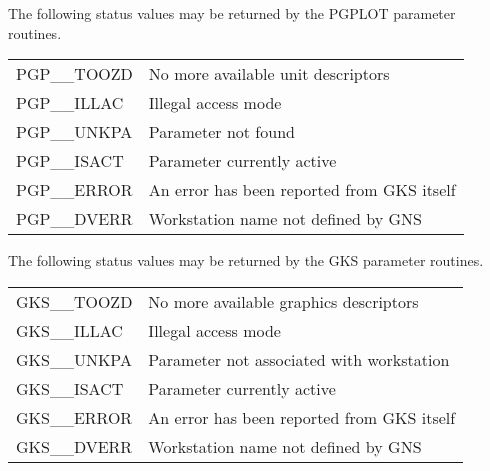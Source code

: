 The following status values may be returned by the PGPLOT parameter
routines.

\begin{tabular}{ll}
PGP\_\_TOOZD     & No more available unit descriptors \\
PGP\_\_ILLAC     & Illegal access mode \\
PGP\_\_UNKPA     & Parameter not found \\
PGP\_\_ISACT     & Parameter currently active \\
PGP\_\_ERROR     & An error has been reported from GKS itself \\
PGP\_\_DVERR     & Workstation name not defined by GNS
\end{tabular}

The following status values may be returned by the GKS parameter
routines.

\begin{tabular}{ll}
GKS\_\_TOOZD     & No more available graphics descriptors \\
GKS\_\_ILLAC     & Illegal access mode \\
GKS\_\_UNKPA     & Parameter not associated with workstation \\
GKS\_\_ISACT     & Parameter currently active \\
GKS\_\_ERROR     & An error has been reported from GKS itself \\
GKS\_\_DVERR     & Workstation name not defined by GNS
\end{tabular}
\newpage







